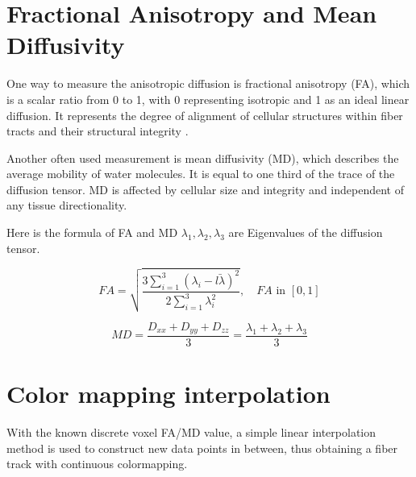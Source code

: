 \documentclass[hyperref, plainreport, noproblem]{cgvpub1}
\begin{document}
\section{Fractional Anisotropy and Mean Diffusivity }
One way to measure the anisotropic diffusion is fractional anisotropy (FA), which is a scalar ratio from 0 to 1, with 0 representing isotropic and 1 as an ideal linear diffusion. It represents the degree of alignment of cellular structures within fiber tracts and their structural integrity \cite{cer}.

Another often used measurement is mean diffusivity (MD), which describes the average mobility of water molecules. It is equal to one third of the trace of the diffusion tensor. MD is affected by cellular size and integrity and independent of any tissue directionality. \cite{cer}

Here is the formula of FA and MD $\lambda_1, \lambda_2, \lambda_3$  are Eigenvalues of the diffusion tensor.

\begin{equation}
	FA=\sqrt{\frac{3 \sum_{i=1}^{3}(\lambda_i-\bar{l\lambda})^2}{2\sum_{i=1}^3\lambda_i^2}}, \quad FA\text{ in } [0,1]
\end{equation}

\begin{equation}
	MD=\frac{D_{xx}+D_{yy}+D_{zz}}{3}= \frac{\lambda_1+\lambda_2+\lambda_3}{3}
\end{equation}

\section{ Color mapping interpolation }
With the known discrete voxel FA/MD value, a simple linear interpolation method is used to construct new data points in between, thus obtaining a fiber track with continuous colormapping.
\end{document}
